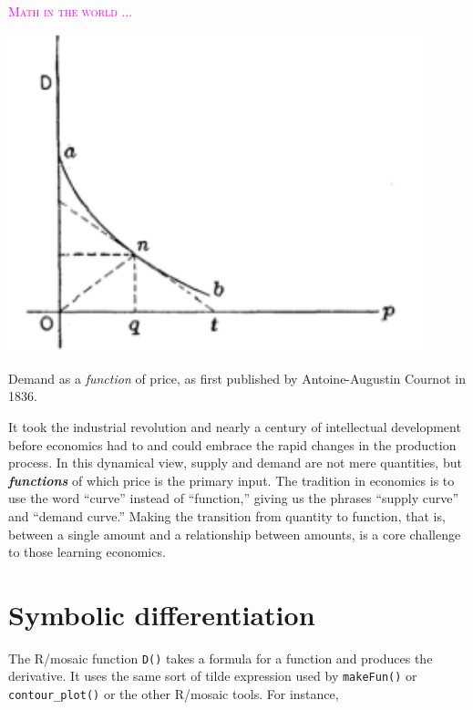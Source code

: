 \documentclass[
  letterpaper,
  DIV=11,
  numbers=noendperiod,
  oneside]{scrreprt}
\newenvironment{intheworld}%
{%
\textcolor{magenta}{\hrulefill}%
  \par\vspace{.3\baselineskip}%
  \textcolor{magenta}{\scshape Math in the world ...}%
  \par\vspace{\baselineskip}%
}%
{\textcolor{magenta}{\hrulefill}}
\begin{document}
\begin{intheworld}
\begin{marginfigure}
{\centering \includegraphics[width=0.9\textwidth,height=\textheight]{Differentiation/www/cournot-demand-curve.png}

}

\caption{Demand as a \emph{function} of price, as first published by
Antoine-Augustin Cournot in 1836.}

\end{marginfigure}

It took the industrial revolution and nearly a century of intellectual
development before economics had to and could embrace the rapid changes
in the production process. In this dynamical view, supply and demand are
not mere quantities, but \textbf{\emph{functions}} of which price is the
primary input. The tradition in economics is to use the word ``curve''
instead of ``function,'' giving us the phrases ``supply curve'' and
``demand curve.'' Making the transition from quantity to function, that
is, between a single amount and a relationship between amounts, is a
core challenge to those learning economics.

\end{intheworld}

\hypertarget{symbolic-differentiation}{%
\section{Symbolic differentiation}\label{symbolic-differentiation}}

The R/mosaic function \texttt{D()} takes a formula for a function and
produces the derivative. It uses the same sort of tilde expression used
by \texttt{makeFun()} or \texttt{contour\_plot()} or the other R/mosaic
tools. For instance,
\end{document}
